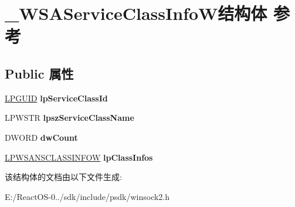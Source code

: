 \hypertarget{struct___w_s_a_service_class_info_w}{}\section{\+\_\+\+W\+S\+A\+Service\+Class\+Info\+W结构体 参考}
\label{struct___w_s_a_service_class_info_w}
\subsection*{Public 属性}
\begin{DoxyCompactItemize}
\item 
\mbox{\label{struct___w_s_a_service_class_info_w_af6eb6d24a6d4b6471d366bbeee1caa12}} 
\hyperlink{interface_g_u_i_d}{L\+P\+G\+U\+ID} {\bfseries lp\+Service\+Class\+Id}
\item 
\mbox{\label{struct___w_s_a_service_class_info_w_ac493b95db04b4515e9c43f5d42602060}} 
L\+P\+W\+S\+TR {\bfseries lpsz\+Service\+Class\+Name}
\item 
\mbox{\label{struct___w_s_a_service_class_info_w_af94f298d2c33b46b7d9a5d722f6455ec}} 
D\+W\+O\+RD {\bfseries dw\+Count}
\item 
\mbox{\label{struct___w_s_a_service_class_info_w_ae90543584858ea67dba45646cd6b86ef}} 
\hyperlink{struct___w_s_a_n_s_class_info_w}{L\+P\+W\+S\+A\+N\+S\+C\+L\+A\+S\+S\+I\+N\+F\+OW} {\bfseries lp\+Class\+Infos}
\end{DoxyCompactItemize}


该结构体的文档由以下文件生成\+:\begin{DoxyCompactItemize}
\item 
E\+:/\+React\+O\+S-\/0../sdk/include/psdk/winsock2.\+h\end{DoxyCompactItemize}
